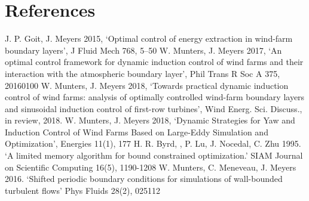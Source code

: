 \documentclass[a4paper]{jpconf}
\begin{document}
%		
%		
%		
%		
%		


\section*{References}
\begin{thebibliography}{9}
	 J. P. Goit, J. Meyers 2015, `Optimal control of energy extraction in wind-farm boundary layers', J Fluid Mech 768, 5--50
	 W. Munters, J. Meyers 2017, `An optimal control framework for dynamic induction control of wind farms and their interaction with the atmospheric boundary layer', Phil Trans R Soc A 375, 20160100
	 W. Munters, J. Meyers 2018, `Towards practical dynamic induction control of wind farms: analysis of optimally controlled wind-farm boundary layers and sinusoidal induction control of first-row turbines', Wind Energ. Sci. Discuss., in review, 2018. 
	 W. Munters, J. Meyers 2018, `Dynamic Strategies for Yaw and Induction Control of Wind Farms Based on Large-Eddy Simulation and Optimization', Energies 11(1), 177
	 H. R. Byrd, , P. Lu, J. Nocedal, C. Zhu 1995. `A limited memory algorithm for bound constrained optimization.' SIAM Journal on Scientific Computing 16(5), 1190-1208
	 W. Munters, C. Meneveau, J. Meyers 2016. `Shifted periodic boundary conditions for simulations of wall-bounded turbulent flows' Phys Fluids 28(2), 025112
\end{thebibliography}
\end{document}
